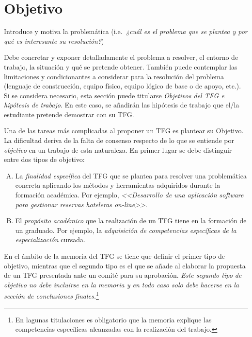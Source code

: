 \chapter{Objetivo}
\label{cap:Objetivo}

Introduce y motiva la problemática (i.e.\emph{\ ¿cuál es el problema que se plantea y por qué es interesante su resolución?})

Debe concretar y exponer detalladamente el problema a resolver, el entorno de 
trabajo, la situación y qué se pretende obtener. También puede contemplar las 
limitaciones y condicionantes a considerar para la resolución del problema 
(lenguaje de construcción, equipo físico, equipo lógico de base o de apoyo, 
etc.). Si se considera necesario, esta sección puede titularse 
\emph{Objetivos del TFG e hipótesis de trabajo}. En este caso, se añadirán 
las hipótesis de trabajo que el/la estudiante pretende demostrar con su TFG.

Una de las tareas más complicadas al proponer un TFG es plantear su \textsf{Objetivo}. La dificultad deriva de la falta de consenso respecto de lo que se entiende por \emph{objetivo} en un trabajo de esta naturaleza. En primer lugar se debe distinguir entre dos tipos de objetivo:

\begin{enumerate}[(A)]
	\item La \emph{finalidad específica} del TFG que se plantea para resolver una problemática concreta aplicando los métodos y herramientas adquiridos durante la formación académica. Por ejemplo, \emph{<<Desarrollo de una aplicación software para gestionar reservas hoteleras \emph{on-line}>>}.
	
	\item El \emph{propósito académico} que la realización de un TFG tiene en la formación de un graduado. Por ejemplo, la \emph{adquisición de competencias específicas de la especialización} cursada.
\end{enumerate}

En el ámbito de la memoria del TFG se tiene que definir el primer tipo de objetivo, mientras que el segundo tipo es el que se añade al elaborar la propuesta de un TFG presentada ante un comité para su aprobación. \emph{Este segundo tipo de objetivo no debe incluirse en la memoria y en todo caso solo debe hacerse en la sección de conclusiones finales.}\footnote{En lagunas titulaciones es obligatorio que la memoria explique las competencias específicas alcanzadas con la realización del trabajo.}

